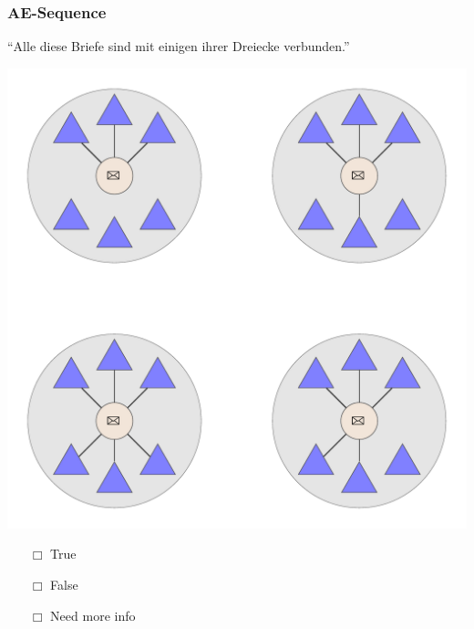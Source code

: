 \documentclass[fleqn,10pt,serif,xcolor=dvipsnames]{beamer}
\renewcommand{\AE}{AE}
\newcommand{\mymark}[1]{{\color{blue}{#1}}}
\begin{document}
\begin{frame}
  \frametitle{\AE-Sequence}
  \begin{center}
    ``Alle diese Briefe sind mit einigen ihrer Dreiecke verbunden.''

    \vspace{0.1cm}

    \includegraphics[width=0.5 \textwidth]{../../pictures/ae_01_7.pdf}

    \vspace{0.1cm}

    \begin{multicols}{3}
      \begin{itemize} 
      \item[$\Box$] True\\
        \onslide<2>{$\leadsto$  \mymark{false}}
      \item[$\Box$] False\\
        \onslide<2>{$\leadsto$ \mymark{local}}
      \item[$\Box$] Need more info 
      \end{itemize}
    \end{multicols}

  \end{center}
\end{frame}
\end{document}
